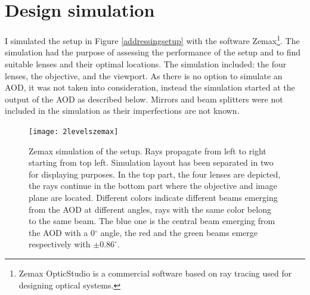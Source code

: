 \section{Design simulation}
I simulated the setup in Figure \ref{addressingsetup} with the software Zemax\footnote{Zemax OpticStudio is a commercial software based on ray tracing used for designing optical systems.}. The simulation had the purpose of assessing the performance of the setup and to find suitable lenses and their optimal locations. The simulation included: the four lenses, the objective, and the viewport. As there is no option to simulate an AOD, it was not taken into consideration, instead the simulation started at the output of the AOD as described below. Mirrors and beam splitters were not included in the simulation as their imperfections are not known.
\begin{figure}
\centering
\texttt{[image: 2levelszemax]}
\caption{Zemax simulation of the setup. Rays propagate from left to right starting from top left. Simulation layout has been separated in two for displaying purposes. In the top part, the four lenses are depicted, the rays continue in the bottom part where the objective and image plane are located. Different colors indicate different beams emerging from the AOD at different angles, rays with the same color belong to the same beam. The blue one is the central beam emerging from the AOD with a 0$^\circ$ angle, the red and the green beams emerge respectively with $\pm0.86^\circ$.}
\label{zemaxview}
\end{figure}
